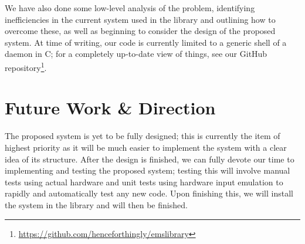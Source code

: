 \documentclass{article}
\begin{document}
We have also done some low-level analysis of the problem, identifying
inefficiencies in the current system used in the library and outlining how to
overcome these, as well as beginning to consider the design of the proposed
system. At time of writing, our code is currently limited to a generic shell of
a daemon in C; for a completely up-to-date view of things, see our GitHub
repository\footnote{\url{https://github.com/henceforthingly/emslibrary}}.

\section{Future Work \& Direction}

The proposed system is yet to be fully designed; this is currently the item of
highest priority as it will be much easier to implement the system with a clear
idea of its structure. After the design is finished, we can fully devote our
time to implementing and testing the proposed system; testing this will involve
manual tests using actual hardware and unit tests using hardware input emulation
to rapidly and automatically test any new code. Upon finishing this, we will
install the system in the library and will then be finished.
\end{document}
